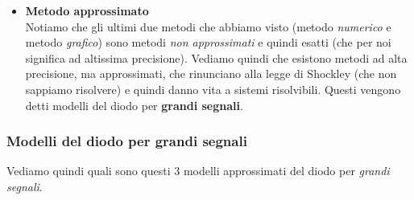 \documentclass[a4paper,11pt]{article}
\begin{document}
\begin{itemize}
Sempre dal grafico, notiamo che variando $R$ si ottengono diversi grafici della retta di carico, che mostrano direttamente la variazione della corrente al punto di quiescenza $Q$. In particoare:
\begin{itemize}
	\item Al diminuire di $R$, si ottiene una retta del fascio con coefficiente angolare più grande (in modulo), e quindi si interseca un punto più alto della curva di Shockley (maggiore corrente $I_D$ sul diodo);
	\item All'aumentare di $R$, si ottiene una retta del fascio con coefficiente angolare più piccolo (in modulo), e quindi si interseca un punto più basso della curva di Shockley (mnore corrente $I_D$ sul diodo);
\end{itemize}

\item \textbf{\textsf{Metodo approssimato}} \\
Notiamo che gli ultimi due metodi che abbiamo visto (metodo \textit{numerico} e metodo \textit{grafico}) sono metodi \textit{non approssimati} e quindi esatti (che per noi significa ad altissima precisione). Vediamo quindi che esistono metodi ad alta precisione, ma approssimati, che rinunciano alla legge di Shockley (che non sappiamo risolvere) e quindi danno vita a sistemi risolvibili.
Questi vengono detti modelli del diodo per \textbf{grandi segnali}.

\end{itemize}

\subsubsection{Modelli del diodo per grandi segnali}
Vediamo quindi quali sono questi 3 modelli approssimati del diodo per \textit{grandi segnali}.
\end{document}

